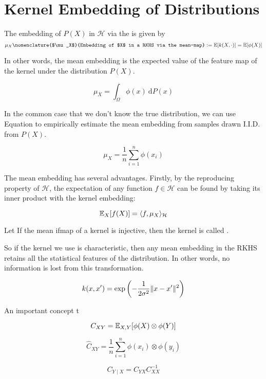 \section{Kernel Embedding of Distributions}

\begin{definition}
The embedding of $P(X)$ in $\mathcal{H}$ via the  is given by
\begin{equation}
  \mu_{X}\nomenclature{$\mu_X$}{Embedding of $X$ in a RKHS via the mean-map} \defeq \E[k(X, \cdot)] = \E[\phi(X)]
\end{equation}
\end{definition}

In other words, the mean embedding is the expected value of the feature map of the kernel under the distribution $P(X)$.

\begin{equation}
\mu_{X} = \int_\Omega \phi(x) \ \mathrm{d}P(x)
\end{equation}

In the common case that we don't know the true distribution, we can use Equation to empirically estimate the mean embedding from samples drawn I.I.D. from $P(X)$.

\begin{equation}
\mu_{X} = \frac{1}{n} \sum_{i=1}^n \phi(x_i)
\end{equation}

The mean embedding has several advantages. Firstly, by the reproducing property of $\mathcal{H}$, the expectation of any function $f \in \mathcal{H}$ can be found by taking its inner product with the kernel embedding:

\begin{equation}
\mathbb{E}_X[f(X)] = \langle f, \mu_X\rangle_\mathcal{H}
\end{equation}

\begin{definition}
  Let If the mean ifmap of a kernel is injective, then the kernel is called .
\end{definition}

So if the kernel we use is characteristic, then any mean embedding in the RKHS retains all the statistical features of the distribution. In other words, no information is lost from this transformation.

\begin{equation}
  k(x,x') = \exp\left(-\frac{1}{2\sigma^2} \lVert x-x'\rVert^2 \right)
\end{equation}

An important concept t

\begin{equation}
  C_{XY} = \mathbb{E}_{X, Y}[\phi(X) \otimes \phi(Y)]
\end{equation}

\begin{equation}
	\widehat{C}_{XY} = \frac{1}{n} \sum_{i=1}^n \phi(x_i) \otimes \phi(y_i)
\end{equation}

\begin{equation}
	C_{Y \mid X} = C_{YX} C_{XX}^{-1}
\end{equation}
